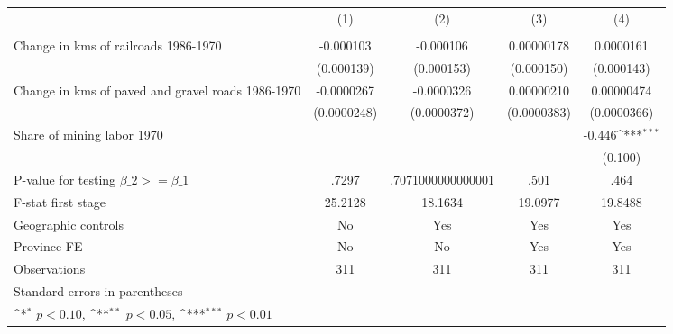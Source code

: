 {
\def\sym#1{\ifmmode^{#1}\else\(^{#1}\)\fi}
\begin{tabular}{l*{4}{c}}
\hline\hline
                &\multicolumn{1}{c}{(1)}&\multicolumn{1}{c}{(2)}&\multicolumn{1}{c}{(3)}&\multicolumn{1}{c}{(4)}\\
                &\multicolumn{1}{c}{}&\multicolumn{1}{c}{}&\multicolumn{1}{c}{}&\multicolumn{1}{c}{}\\
\hline
Change in kms of railroads 1986-1970&-0.000103         &-0.000106         &0.00000178         &0.0000161         \\
                &(0.000139)         &(0.000153)         &(0.000150)         &(0.000143)         \\
[1em]
Change in kms of paved and gravel roads 1986-1970&-0.0000267         &-0.0000326         &0.00000210         &0.00000474         \\
                &(0.0000248)         &(0.0000372)         &(0.0000383)         &(0.0000366)         \\
[1em]
Share of mining labor 1970&                  &                  &                  &   -0.446\sym{***}\\
                &                  &                  &                  &  (0.100)         \\
\hline
P-value for testing $\beta\_{2} >= \beta\_{1}$&    .7297         &.7071000000000001         &     .501         &     .464         \\
F-stat first stage&  25.2128         &  18.1634         &  19.0977         &  19.8488         \\
Geographic controls&       No         &      Yes         &      Yes         &      Yes         \\
Province FE     &       No         &       No         &      Yes         &      Yes         \\
Observations    &      311         &      311         &      311         &      311         \\
\hline\hline
\multicolumn{5}{l}{\footnotesize Standard errors in parentheses}\\
\multicolumn{5}{l}{\footnotesize \sym{*} \(p<0.10\), \sym{**} \(p<0.05\), \sym{***} \(p<0.01\)}\\
\end{tabular}
}
